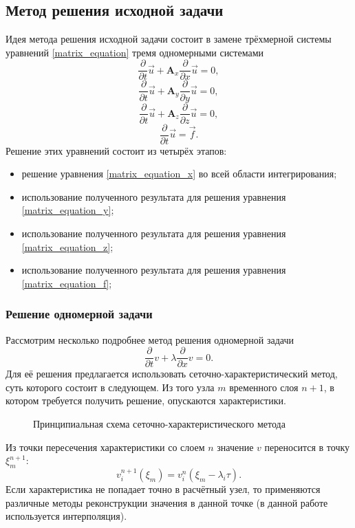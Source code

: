 \subsection{Метод решения исходной задачи}
Идея метода \cite{fedorenko} решения исходной задачи состоит в замене трёхмерной системы
уравнений \ref{matrix_equation} тремя одномерными системами 
\begin{equation}
\frac{\partial}{\partial t}\vec u+\mathbf{A}_x \frac{\partial}{\partial x}\vec u
= 0,
\label{matrix_equation_x}
\end{equation}
\begin{equation}
\frac{\partial}{\partial t}\vec u+\mathbf{A}_y \frac{\partial}{\partial y}\vec u
= 0,
\label{matrix_equation_y}
\end{equation}
\begin{equation}
\frac{\partial}{\partial t}\vec u+\mathbf{A}_z \frac{\partial}{\partial z}\vec u
= 0,
\label{matrix_equation_z}
\end{equation}
\begin{equation}
\frac{\partial}{\partial t}\vec u = \vec f.
\label{matrix_equation_f}
\end{equation}
Решение этих уравнений состоит из четырёх этапов:
\begin{itemize}
\item решение уравнения \ref{matrix_equation_x} во всей области интегрирования;
\item использование полученного результата для решения уравнения \ref{matrix_equation_y};
\item использование полученного результата для решения уравнения \ref{matrix_equation_z};
\item использование полученного результата для решения уравнения \ref{matrix_equation_f};
\end{itemize}
\subsubsection{Решение одномерной задачи}
Рассмотрим несколько подробнее метод решения одномерной задачи
\begin{equation}
\frac{\partial}{\partial t}v+\lambda \frac{\partial}{\partial x}v = 0.
\label{one_dim_eq}
\end{equation}
Для её решения предлагается использовать сеточно-характеристический метод, суть
которого состоит в следующем. Из того узла $m$ временного слоя $n+1$, в котором
требуется получить решение, опускаются характеристики.
\begin{figure}[h]
\caption{Принципиальная схема сеточно-характеристического метода}
\end{figure}
Из точки пересечения характеристики со слоем $n$ значение $v$ переносится в 
точку $\xi^{n+1}_m$:
$$v_i^{n+1}(\xi_m)=v^{n}_i(\xi_m-\lambda_i\tau).$$
Если характеристика не попадает точно в расчётный узел, то применяются различные
методы реконструкции значения в данной точке (в данной работе используется
интерполяция).
